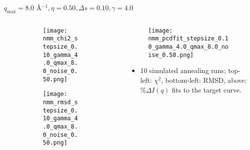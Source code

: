 \documentclass{beamer}
\begin{document}
\begin{frame}{$ q_{\textrm{max}}=8.0 $ \AA $^{-1}, \eta=0.50, \Delta s=0.10, \gamma=4.0$}
	\begin{columns}
		\begin{column}{.5\textwidth}
			\begin{figure}[H]
			\centering
			\begin{subfigure}[b]{\textwidth}
				\centering
				\texttt{[image: nmm\_chi2\_stepsize\_0.10\_gamma\_4.0\_qmax\_8.0\_noise\_0.50.png]}
				\label{fig:}
			\end{subfigure}
			\begin{subfigure}[b]{\textwidth}
				\centering
				\texttt{[image: nmm\_rmsd\_stepsize\_0.10\_gamma\_4.0\_qmax\_8.0\_noise\_0.50.png]}
				\label{fig:}
			\end{subfigure}
			\end{figure}
		\end{column}
		\begin{column}{.5\textwidth}
			\begin{figure}[H]
				\centering
				\texttt{[image: nmm\_pcdfit\_stepsize\_0.10\_gamma\_4.0\_qmax\_8.0\_noise\_0.50.png]}
				\label{fig:}
			\end{figure}
			\begin{itemize}
				\item 10 simulated annealing runs; top-left: $\chi^2$, bottom-left: RMSD, above: $\%\Delta I(q)$ fits to the target curve.
			\end{itemize}
		\end{column}
	\end{columns}
\end{frame}
 
\end{document}
